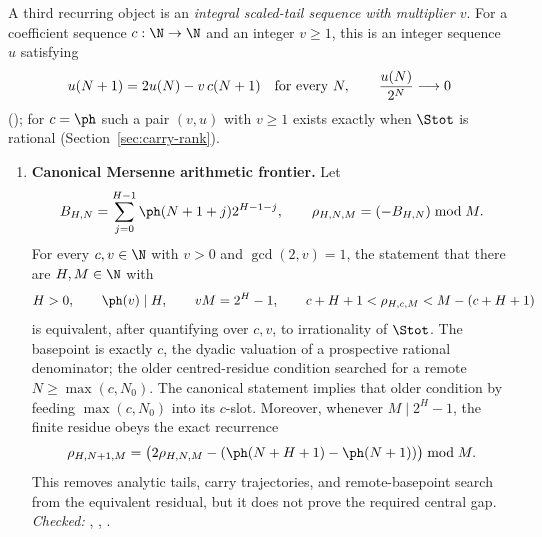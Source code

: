 A third recurring object is an \emph{integral scaled-tail sequence with
multiplier $v$}.  For a coefficient sequence $c:\N\to\N$ and an integer
$v\ge1$, this
is an integer sequence $u$ satisfying
\[
  u(N+1)=2u(N)-v\,c(N+1)\quad\hbox{for every }N,
  \qquad
  \frac{u(N)}{2^N}\longrightarrow0
\]
();
for $c=\ph$ such a pair $(v,u)$ with $v\ge1$ exists exactly when $\Stot$ is
rational (Section~\ref{sec:carry-rank}).



{\small
\begin{enumerate}[label=\textbf{R\arabic*.},ref=R\arabic*,leftmargin=2.4em,
  itemsep=0.2em,topsep=0.25em]

\item\label{res:canonicalmersenne} 
\textbf{Canonical Mersenne arithmetic frontier.}  Let
\[
 B_{H,N}=\sum_{j=0}^{H-1}\ph(N+1+j)2^{H-1-j},\qquad
 \rho_{H,N,M}=(-B_{H,N})\bmod M.
\]
For every $c,v\in\N$ with $v>0$ and $\gcd(2,v)=1$, the statement that there
are $H,M\in\N$ with
\[
 H>0,\qquad \ph(v)\mid H,\qquad vM=2^H-1,
 \qquad c+H+1<\rho_{H,c,M}<M-(c+H+1)
\]
is equivalent, after quantifying over $c,v$, to irrationality of $\Stot$.
	The basepoint is exactly $c$, the dyadic valuation of a prospective rational
	denominator; the older centred-residue condition searched for a remote
	$N\ge\max(c,N_0)$.  The canonical statement implies that older condition by
feeding $\max(c,N_0)$ into its $c$-slot.  Moreover, whenever $M\mid2^H-1$,
the finite residue obeys the exact recurrence
\[
 \rho_{H,N+1,M}
 =\bigl(2\rho_{H,N,M}-(\ph(N+H+1)-\ph(N+1))\bigr)\bmod M.
\]
This removes analytic tails, carry trajectories, and remote-basepoint search
from the equivalent residual, but it does not prove the required central gap.
{\footnotesize\emph{Checked:}
,
,
.}


\end{enumerate}}
